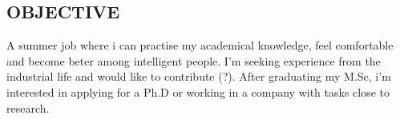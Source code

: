 \documentclass[11pt]{res}
\begin{document}
 
$\:$ \\
\begin{resume}

\section{OBJECTIVE}          	
	A summer job where i can practise my academical knowledge, feel comfortable and become beter among intelligent people.
	I'm seeking experience from the industrial life and would like to contribute (?).
	After graduating my M.Sc, i'm interested in applying for a Ph.D or working in a company with tasks close to research.



\end{resume}
\end{document}
